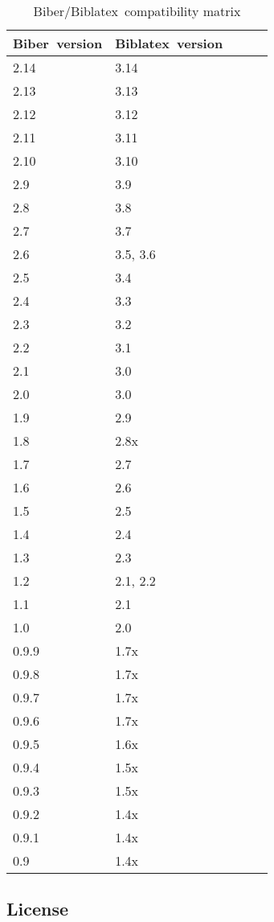\documentclass{ltxdockit}
\newcommand*{\biber}{Biber\xspace}
\newcommand*{\biblatex}{Biblatex\xspace}
\begin{document}
\begin{table}
\begin{center}
\small
\begin{tabular}{lllll}
\toprule
\biber\ version & \biblatex\ version\\
\midrule
2.14 & 3.14\\
2.13 & 3.13\\
2.12 & 3.12\\
2.11 & 3.11\\
2.10 & 3.10\\
2.9 & 3.9\\
2.8 & 3.8\\
2.7 & 3.7\\
2.6 & 3.5, 3.6\\
2.5 & 3.4\\
2.4 & 3.3\\
2.3 & 3.2\\
2.2 & 3.1\\
2.1 & 3.0\\
2.0 & 3.0\\
1.9 & 2.9\\
1.8 & 2.8x\\
1.7 & 2.7\\
1.6 & 2.6\\
1.5 & 2.5\\
1.4 & 2.4\\
1.3 & 2.3\\
1.2 & 2.1, 2.2\\
1.1 & 2.1\\
1.0 & 2.0\\
0.9.9 & 1.7x\\
0.9.8 & 1.7x\\
0.9.7 & 1.7x\\
0.9.6 & 1.7x\\
0.9.5 & 1.6x\\
0.9.4 & 1.5x\\
0.9.3 & 1.5x\\
0.9.2 & 1.4x\\
0.9.1 & 1.4x\\
0.9 & 1.4x\\
\bottomrule
\end{tabular}
\end{center}
\caption{\biber/\biblatex\ compatibility matrix}
\label{tab:compat}
\end{table}

\subsection{License}
\end{document}
